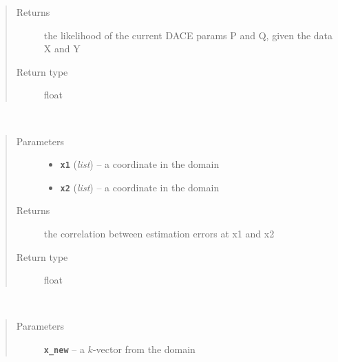 \documentclass[letterpaper,10pt,english]{sphinxmanual}
\begin{document}
\begin{fulllineitems}
\begin{fulllineitems}
\begin{quote}
\begin{description}
\begin{itemize}
\end{itemize}

\item[{Returns}] \leavevmode
the likelihood of the current DACE params P and Q, given the data X and Y

\item[{Return type}] \leavevmode
float

\end{description}\end{quote}

\end{fulllineitems}


\begin{fulllineitems}
\label{index:smbo.models.dace.corr}~\begin{quote}\begin{description}
\item[{Parameters}] \leavevmode\begin{itemize}
\item {} 
\textbf{\texttt{x1}} (\emph{list}) -- a coordinate in the domain

\item {} 
\textbf{\texttt{x2}} (\emph{list}) -- a coordinate in the domain

\end{itemize}

\item[{Returns}] \leavevmode
the correlation between estimation errors at x1 and x2

\item[{Return type}] \leavevmode
float

\end{description}\end{quote}

\end{fulllineitems}


\begin{fulllineitems}
\label{index:smbo.models.dace.corr_vector}~\begin{quote}\begin{description}
\item[{Parameters}] \leavevmode
\textbf{\texttt{x\_new}} -- a \(k\)-vector from the domain


\end{description}
\end{quote}
\end{fulllineitems}
\end{fulllineitems}
\end{document}
